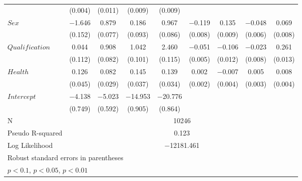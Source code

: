 {\begin{longtable}{l*8c}
  & (0.004) & (0.011) & (0.009) & (0.009) \\
  $\mathit{Sex}$ & $-$1.646\sym{***}& 0.879\sym{***}&
  0.186\sym{**} & 0.967\sym{***}
  & $-$0.119\sym{***}& 0.135\sym{***}& $-$0.048\sym{***}& 0.069\sym{***}\\
  & (0.152) & (0.077) & (0.093) & (0.086)
  & (0.008) & (0.009) & (0.006) & (0.008) \\
  $\mathit{Qualification}$ & 0.044 & 0.908\sym{***}&
  1.042\sym{***}& 2.460\sym{***}
  & $-$0.051\sym{***}& $-$0.106\sym{***}& $-$0.023\sym{***}& 0.261\sym{***}\\
  & (0.112) & (0.082) & (0.101) & (0.115)
  & (0.005) & (0.012) & (0.008) & (0.013) \\
  $\mathit{Health}$ & 0.126\sym{***}& 0.082\sym{***}&
  0.145\sym{***}& 0.139\sym{***}
  & 0.002 & $-$0.007\sym{*}  & 0.005\sym{*}  & 0.008\sym{**} \\
  & (0.045) & (0.029) & (0.037) & (0.034)
  & (0.002) & (0.004) & (0.003) & (0.004) \\
  $\mathit{Intercept}$ & $-$4.138\sym{***}& $-$5.023\sym{***}&
  $-$14.953\sym{***}& $-$20.776\sym{***}
  &&&& \\
  & (0.749) & (0.592) & (0.905) & (0.864)
  &&&& \\
  N & \multicolumn{8}{c}{10246} \\
  Pseudo R-squared & \multicolumn{8}{c}{0.123} \\
  Log Likelihood & \multicolumn{8}{c}{$-$12181.461} \\
  \bottomrule
  \multicolumn{9}{l}{\tiny Robust standard errors in parentheses} \\
  \multicolumn{9}{l}{\tiny \sym{*} \(p<0.1\), \sym{**} \(p<0.05\), \sym{***} \(p<0.01\)} \\
\end{longtable}
}
